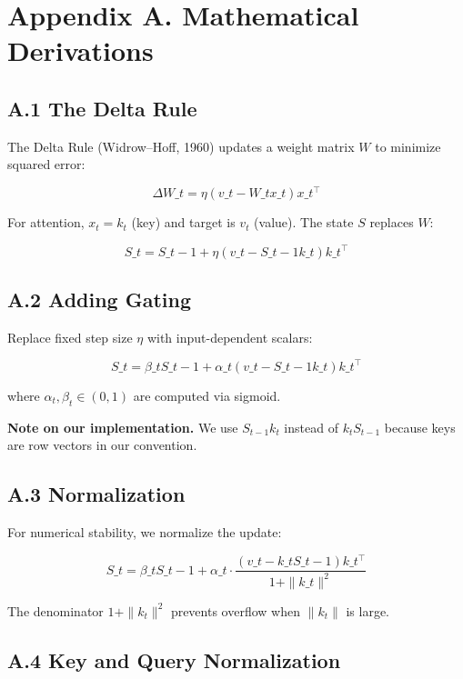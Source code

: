 
\section{Appendix A. Mathematical Derivations}

\subsection{A.1 The Delta Rule}

The Delta Rule (Widrow--Hoff, 1960) updates a weight matrix $W$ to 
minimize squared error:

\[
\Delta W\_t = \eta (v\_t - W\_t x\_t) x\_t^\top
\tag{A.1}
\]

For attention, $x_t = k_t$ (key) and target is $v_t$ (value). The state 
$S$ replaces $W$:

\[
S\_t = S\_{t-1} + \eta (v\_t - S\_{t-1} k\_t) k\_t^\top
\tag{A.2}
\]

\subsection{A.2 Adding Gating}

Replace fixed step size $\eta$ with input-dependent scalars:

\[
S\_t = \beta\_t S\_{t-1} + \alpha\_t (v\_t - S\_{t-1} k\_t) k\_t^\top
\tag{A.3}
\]

where $\alpha_t, \beta_t \in (0, 1)$ are computed via sigmoid.

\textbf{Note on our implementation.} We use $S_{t-1} k_t$ instead of $k_t S_{t-1}$ 
because keys are row vectors in our convention.

\subsection{A.3 Normalization}

For numerical stability, we normalize the update:

\[
S\_t = \beta\_t S\_{t-1} + \alpha\_t \cdot \frac{(v\_t - k\_t S\_{t-1}) k\_t^\top}{1 + \|k\_t\|^2}
\tag{A.4}
\]

The denominator $1 + \|k_t\|^2$ prevents overflow when $\|k_t\|$ is large.

\subsection{A.4 Key and Query Normalization}

